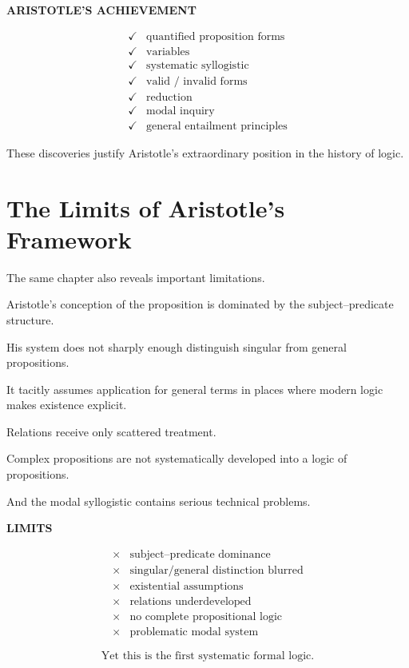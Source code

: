 \documentclass[11pt]{article}
\begin{document}
\begin{whiteboard}
\textbf{ARISTOTLE'S ACHIEVEMENT}

\[
\begin{array}{ll}
\checkmark & \text{quantified proposition forms}\\
\checkmark & \text{variables}\\
\checkmark & \text{systematic syllogistic}\\
\checkmark & \text{valid / invalid forms}\\
\checkmark & \text{reduction}\\
\checkmark & \text{modal inquiry}\\
\checkmark & \text{general entailment principles}
\end{array}
\]
\end{whiteboard}

These discoveries justify Aristotle's extraordinary position in
the history of logic.

\section{The Limits of Aristotle's Framework}

The same chapter also reveals important limitations.

Aristotle's conception of the proposition is dominated by the
subject--predicate structure.

His system does not sharply enough distinguish singular from
general propositions.

It tacitly assumes application for general terms in places where
modern logic makes existence explicit.

Relations receive only scattered treatment.

Complex propositions are not systematically developed into a
logic of propositions.

And the modal syllogistic contains serious technical problems.

\begin{whiteboard}
\textbf{LIMITS}

\[
\begin{array}{ll}
\times & \text{subject--predicate dominance}\\
\times & \text{singular/general distinction blurred}\\
\times & \text{existential assumptions}\\
\times & \text{relations underdeveloped}\\
\times & \text{no complete propositional logic}\\
\times & \text{problematic modal system}
\end{array}
\]

\vspace{0.5em}

\[
\boxed{\text{Yet this is the first systematic formal logic.}}
\]
\end{whiteboard}
\end{document}

